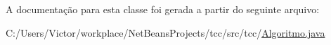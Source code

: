 A documentação para esta classe foi gerada a partir do seguinte arquivo\-:\begin{DoxyCompactItemize}
\item 
C\-:/\-Users/\-Victor/workplace/\-Net\-Beans\-Projects/tcc/src/tcc/\hyperlink{_algoritmo_8java}{Algoritmo.\-java}\end{DoxyCompactItemize}
